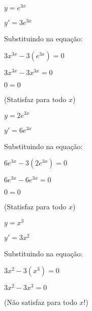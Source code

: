 \documentclass[a4paper]{article}
\begin{document}
\begin{multicols}{3}

$y=e^{3x}$

$y' = 3e^{3x}$

Substituindo na equação:

$3x^{3x} - 3(e^{3x}) = 0$

$3x^{3x} - 3x^{3x} =0$

$0=0$

(Statisfaz para todo $x$)

\columnbreak

$y=2e^{3x}$

$y' = 6e^{3x}$

Substituindo na equação:

$6e^{3x} - 3(2e^{3x}) = 0$

$6e^{3x} - 6e^{3x} =0$

$0=0$

(Statisfaz para todo $x$)

\columnbreak

$y=x^3$

$y' = 3x^2$

Substituindo na equação:

$3x^2 - 3(x^3) =0 $

$3x^2 - 3x^3 =0 $

(Não satisfaz para todo $x$!)

\end{multicols}



\end{document}
